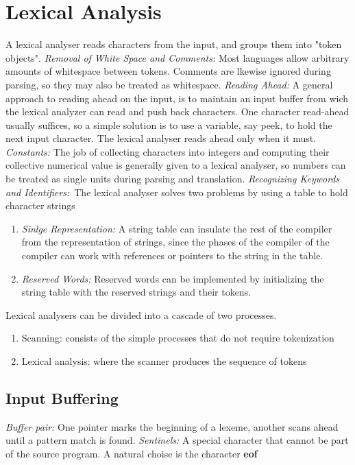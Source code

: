 \section{Lexical Analysis}
A lexical analyser reads characters from the input, and groups them into "token objects". 
\emph{Removal of White Space and Comments:} Most languages allow arbitrary amounts of whitespace between tokens. Comments are lkewise ignored during parsing, so they may also be treated as whitespace.
\emph{Reading Ahead:} A general approach to reading ahead on the input, is to maintain an input buffer from wich the lexical analyzer can read and push back characters. One character read-ahead usually suffices, so a simple solution is to use a variable, say peek, to hold the next input character. The lexical analyser reads ahead only when it must. 
\emph{Constants:} The job of collecting characters into integers and computing their collective numerical value is generally given to a lexical analyser, so numbers can be treated as single units during parsing and translation. 
\emph{Recognizing Keywords and Identifiers:} The lexical analyser solves two problems by using a table to hold character strings
\begin{enumerate}
	\item{\emph{Sinlge Representation:} A string table can insulate the rest of the compiler from the representation of strings, since the phases of the compiler of the compiler can work with references or pointers to the string in the table.} 
	\item{\emph{Reserved Words:} Reserved words can be implemented by initializing the string table with the reserved strings and their tokens.}
\end{enumerate}

Lexical analysers can be divided into a cascade of two processes.
\begin{enumerate}
	\item{Scanning: consists of the simple processes that do not require tokenization}
	\item{Lexical analysis: where the scanner produces the sequence of tokens}
\end{enumerate}

\subsection{Input Buffering}
\emph{Buffer pair:} One pointer marks the beginning of a lexeme, another scans ahead until a pattern match is found.
\emph{Sentinels:} A special character that cannot be part of the source program. A natural choise is the character \textbf{eof}

